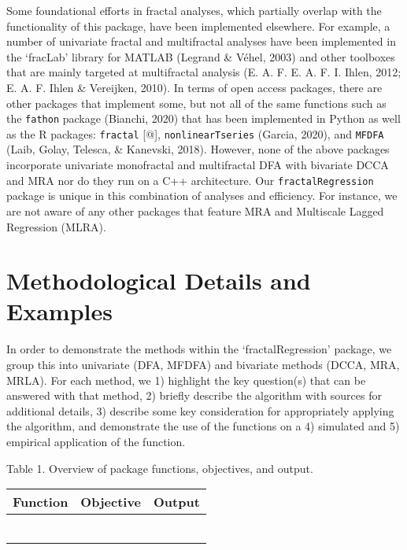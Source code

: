 \documentclass[
  english,
  man]{apa6}
\begin{document}
Some foundational efforts in fractal analyses, which partially overlap
with the functionality of this package, have been implemented elsewhere.
For example, a number of univariate fractal and multifractal analyses
have been implemented in the `fracLab' library for MATLAB (Legrand \& Véhel, 2003)
and other toolboxes that are mainly targeted at multifractal analysis
(E. A. F. E. A. F. I. Ihlen, 2012; E. A. F. Ihlen \& Vereijken, 2010). In terms of
open access packages, there are other packages that implement some, but
not all of the same functions such as the \texttt{fathon} package
(Bianchi, 2020) that has been implemented in Python as well as the R
packages: \texttt{fractal} {[}@{]}, \texttt{nonlinearTseries}
(Garcia, 2020), and \texttt{MFDFA}
(Laib, Golay, Telesca, \& Kanevski, 2018). However, none of the above packages
incorporate univariate monofractal and multifractal DFA with bivariate
DCCA and MRA nor do they run on a C++ architecture. Our
\texttt{fractalRegression} package is unique in this combination of analyses
and efficiency. For instance, we are not aware of any other packages
that feature MRA and Multiscale Lagged Regression (MLRA).

\hypertarget{methodological-details-and-examples}{%
\section{Methodological Details and Examples}\label{methodological-details-and-examples}}

In order to demonstrate the methods within the `fractalRegression'
package, we group this into univariate (DFA, MFDFA) and bivariate
methods (DCCA, MRA, MRLA). For each method, we 1) highlight the key
question(s) that can be answered with that method, 2) briefly describe
the algorithm with sources for additional details, 3) describe some key
consideration for appropriately applying the algorithm, and demonstrate
the use of the functions on a 4) simulated and 5) empirical application
of the function.

Table 1. Overview of package functions, objectives, and output.

\begin{longtable}[]{@{}lll@{}}
\toprule
Function & Objective & Output \\
\midrule
\endhead
& & \\
& & \\
& & \\
& & \\
& & \\
& & \\
\bottomrule
\end{longtable}
\end{document}
